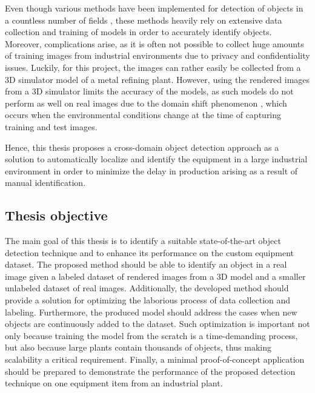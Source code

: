 Even though various methods have been implemented for detection of objects in a countless number of fields \cite{ima, Liu2015, He2017, Redmon2015a, Zhang2021b, Tian2019}, these methods heavily rely on extensive data collection and training of models in order to accurately identify objects. Moreover, complications arise, as it is often not possible to collect huge amounts of training images from industrial environments due to privacy and confidentiality issues. Luckily, for this project, the images can rather easily be collected from a 3D simulator model of a metal refining plant. However, using the rendered images from a 3D simulator limits the accuracy of the models, as such models do not perform as well on real images due to the domain shift phenomenon \cite{Ganin2015}, which occurs when the environmental conditions change at the time of capturing training and test images. 

Hence, this thesis proposes a cross-domain object detection approach as a solution to automatically localize and identify the equipment in a large industrial environment in order to minimize the delay in production arising as a result of manual identification. 


\clearpage

\subsection{Thesis objective}
\label{objective} 
The main goal of this thesis is to identify a suitable state-of-the-art object detection technique and to enhance its performance on the custom equipment dataset. The proposed method should be able to identify an object in a real image given a labeled dataset of rendered images from a 3D model and a smaller unlabeled dataset of real images. Additionally, the developed method should provide a solution for optimizing the laborious process of data collection and labeling. Furthermore, the produced model should address the cases when new objects are continuously added to the dataset.  Such optimization is important not only because training the model from the scratch is a time-demanding process, but also because large plants contain thousands of objects, thus making scalability a critical requirement. Finally, a minimal proof-of-concept application should be prepared to demonstrate the performance of the proposed detection technique on one equipment item from an industrial plant.  

